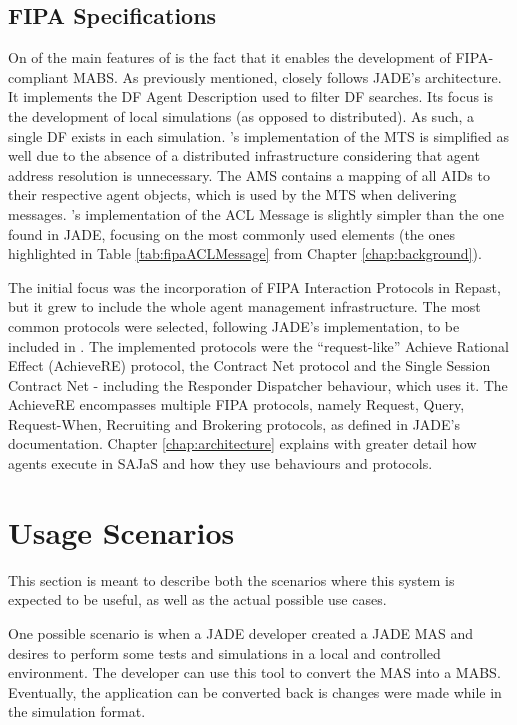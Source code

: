 \subsection{FIPA Specifications}

On of the main features of \apiname{} is the fact that it enables the development of FIPA-compliant MABS.
As previously mentioned, \apiname{} closely follows JADE's architecture.
It implements the DF Agent Description used to filter DF searches. Its focus is the development of local simulations (as opposed to distributed). As such, a single DF exists in each simulation. \apiname{}'s implementation of the MTS is simplified as well due to the absence of a distributed infrastructure considering that agent address resolution is unnecessary. The AMS contains a mapping of all AIDs to their respective agent objects, which is used by the MTS when delivering messages.
\apiname{}'s implementation of the ACL Message is slightly simpler than the one found in JADE, focusing on the most commonly used elements (the ones highlighted in Table \ref{tab:fipaACLMessage} from Chapter \ref{chap:background}).

The initial focus was the incorporation of \gls{FIPA} Interaction Protocols in Repast, but it grew to include the whole agent management infrastructure. The most common protocols were selected, following JADE's implementation, to be included in \apiname{}.
The implemented protocols were the ``request-like'' Achieve Rational Effect (AchieveRE) protocol, the Contract Net protocol and the Single Session Contract Net - including the Responder Dispatcher behaviour, which uses it. The AchieveRE encompasses multiple \gls{FIPA} protocols, namely Request, Query, Request-When, Recruiting and Brokering protocols, as defined in JADE's documentation. Chapter \ref{chap:architecture} explains with greater detail how agents execute in SAJaS and how they use behaviours and protocols.

\section{Usage Scenarios}
This section is meant to describe both the scenarios where this system is expected to be useful, as well as the actual possible use cases.

One possible scenario is when a JADE developer created a JADE MAS and desires to perform some tests and simulations in a local and controlled environment. The developer can use this tool to convert the MAS into a MABS. Eventually, the application can be converted back is changes were made while in the simulation format.

